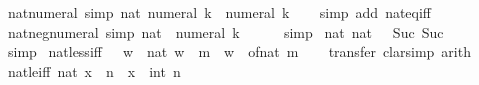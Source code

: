 \begin{isabellebody}
\ nat{\isacharunderscore}{\kern0pt}numeral\ {\isacharbrackleft}{\kern0pt}simp{\isacharbrackright}{\kern0pt}{\isacharcolon}{\kern0pt}\ {\isachardoublequoteopen}nat\ {\isacharparenleft}{\kern0pt}numeral\ k{\isacharparenright}{\kern0pt}\ {\isacharequal}{\kern0pt}\ numeral\ k{\isachardoublequoteclose}\isanewline
%
\isadelimproof
\ \ %
\endisadelimproof
%
\isatagproof
{}\isamarkupfalse%
\ {\isacharparenleft}{\kern0pt}simp\ add{\isacharcolon}{\kern0pt}\ nat{\isacharunderscore}{\kern0pt}eq{\isacharunderscore}{\kern0pt}iff{\isacharparenright}{\kern0pt}%
\endisatagproof
{\isafoldproof}%
%
\isadelimproof
\isanewline
%
\endisadelimproof
\isanewline
{}\isamarkupfalse%
\ nat{\isacharunderscore}{\kern0pt}neg{\isacharunderscore}{\kern0pt}numeral\ {\isacharbrackleft}{\kern0pt}simp{\isacharbrackright}{\kern0pt}{\isacharcolon}{\kern0pt}\ {\isachardoublequoteopen}nat\ {\isacharparenleft}{\kern0pt}{\isacharminus}{\kern0pt}\ numeral\ k{\isacharparenright}{\kern0pt}\ {\isacharequal}{\kern0pt}\ {}{\isachardoublequoteclose}\isanewline
%
\isadelimproof
\ \ %
\endisadelimproof
%
\isatagproof
{}\isamarkupfalse%
\ simp%
\endisatagproof
{\isafoldproof}%
%
\isadelimproof
\isanewline
%
\endisadelimproof
\isanewline
{}\isamarkupfalse%
\ nat{\isacharunderscore}{\kern0pt}{}{\isacharcolon}{\kern0pt}\ {\isachardoublequoteopen}nat\ {}\ {\isacharequal}{\kern0pt}\ Suc\ {\isacharparenleft}{\kern0pt}Suc\ {}{\isacharparenright}{\kern0pt}{\isachardoublequoteclose}\isanewline
%
\isadelimproof
\ \ %
\endisadelimproof
%
\isatagproof
{}\isamarkupfalse%
\ simp%
\endisatagproof
{\isafoldproof}%
%
\isadelimproof
\isanewline
%
\endisadelimproof
\isanewline
{}\isamarkupfalse%
\ nat{\isacharunderscore}{\kern0pt}less{\isacharunderscore}{\kern0pt}iff{\isacharcolon}{\kern0pt}\ {\isachardoublequoteopen}{}\ {\isasymle}\ w\ {\isasymLongrightarrow}\ nat\ w\ {\isacharless}{\kern0pt}\ m\ {\isasymlongleftrightarrow}\ w\ {\isacharless}{\kern0pt}\ of{\isacharunderscore}{\kern0pt}nat\ m{\isachardoublequoteclose}\isanewline
%
\isadelimproof
\ \ %
\endisadelimproof
%
\isatagproof
{}\isamarkupfalse%
\ transfer\ {\isacharparenleft}{\kern0pt}clarsimp{\isacharcomma}{\kern0pt}\ arith{\isacharparenright}{\kern0pt}%
\endisatagproof
{\isafoldproof}%
%
\isadelimproof
\isanewline
%
\endisadelimproof
\isanewline
{}\isamarkupfalse%
\ nat{\isacharunderscore}{\kern0pt}le{\isacharunderscore}{\kern0pt}iff{\isacharcolon}{\kern0pt}\ {\isachardoublequoteopen}nat\ x\ {\isasymle}\ n\ {\isasymlongleftrightarrow}\ x\ {\isasymle}\ int\ n{\isachardoublequoteclose}\isanewline

\end{isabellebody}
